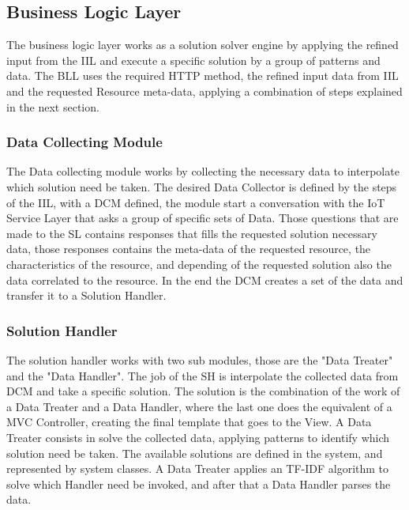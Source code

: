 \documentclass[3p,times]{elsarticle}
\begin{document}
\subsection{Business Logic Layer}
\label{business_logic_layer}

The business logic layer works as a solution solver engine by applying the refined input from the IIL and execute a specific solution by a group of patterns and data.
The BLL uses the required HTTP method, the refined input data from IIL and the requested Resource meta-data, applying a combination of steps explained in the next section.

\subsubsection{Data Collecting Module}
\label{data_collecting_module}

The Data collecting module works by collecting the necessary data to interpolate which solution need be taken. The desired Data Collector is defined by the steps of the IIL, with a DCM defined, the module start a conversation with the IoT Service Layer that asks a group of specific sets of Data. 
Those questions that are made to the SL contains responses that fills the requested solution necessary data, those responses contains the meta-data of the requested resource, the characteristics of the resource, and depending of the requested solution also the data correlated to the resource. In the end the DCM creates a set of the data and transfer it to a Solution Handler.

\subsubsection{Solution Handler}
\label{solution_handler}

The solution handler works with two sub modules, those are the "Data Treater" and the "Data Handler". The job of the SH is interpolate the collected data from DCM and take a specific solution. The solution is the combination of the work of a Data Treater and a Data Handler, where the last one does the equivalent of a MVC Controller, creating the final template that goes to the View.
A Data Treater consists in solve the collected data, applying patterns to identify which solution need be taken. The available solutions are defined in the system, and represented by system classes. A Data Treater applies an TF-IDF algorithm to solve which Handler need be invoked, and after that a Data Handler parses the data.
\end{document}
